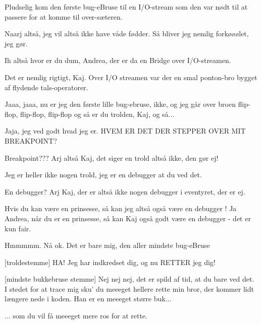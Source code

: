 \documentclass[a4paper,11pt]{article}
\begin{document}
\begin{sketch}
  Pludselig kom den første bug-eBruse til en I/O-stream som den var nødt til at passere for at komme til over-sæteren.
   
   Naarj altså, jeg vil altså ikke have våde fødder. Så bliver jeg nemlig
  forkøøølet, jeg gør.

   Ih altså hvor er du dum, Andrea, der er da en Bridge over
  I/O-streamen.
   
   Det er nemlig rigtigt, Kaj.   Over I/O streamen var der en smal ponton-bro bygget af flydende tals-operatorer.

   Jaaa, jaaa, nu er jeg den første lille bug-ebruse, ikke, og jeg går
  over broen  flip-flop, flip-flop, flip-flop
   og så er du trolden, Kaj, og så...

   Jaja, jeg ved godt hvad jeg er.   HVEM ER DET
  DER STEPPER OVER MIT BREAKPOINT?

   Breakpoint??? Arj altså Kaj, det siger en trold altså ikke, den gør ej!

   Jeg er heller ikke nogen trold, jeg er en debugger at du ved det.

   En debugger? Arj Kaj, der er altså ikke nogen debugger i eventyret, der er ej.

   Hvis du kan være en prinsesse, så kan jeg altså også være en debugger
!
   Ja Andrea, når du er en prinsesse, så kan Kaj også godt være en
  debugger - det er kun fair.

% 
% 
   Hmmmmm. Nå ok.   Det er bare mig, den
  aller mindste bug-eBruse

  [troldestemme] HA! Jeg har indkredset dig, og nu RETTER jeg dig!

   [mindste bukkebruse stemme] Nej nej nej, det er spild af tid, at du
  bare ved det.  I stedet for at trace mig sku' du meeeget hellere rette min
  bror, der kommer lidt længere nede i koden.  Han er en meeeget større buk...


   ... som du vil få meeeget mere ros for at rette. 

% 


\end{sketch}
\end{document}
